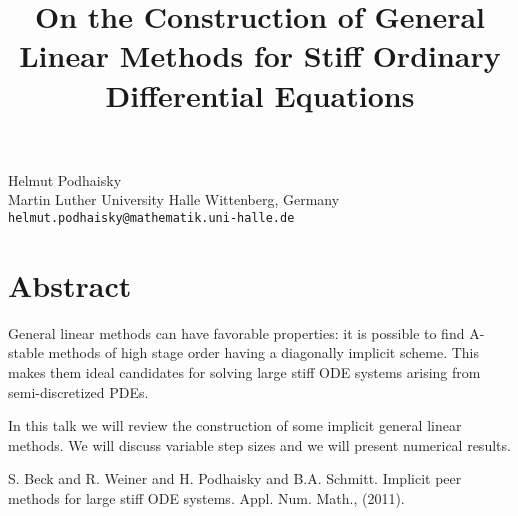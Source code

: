 \title{On the Construction of General Linear Methods for Stiff Ordinary Differential Equations}
 \author{} \institute{}
\maketitle
\begin{center}
{\large Helmut Podhaisky}\\
Martin Luther University Halle Wittenberg, Germany\\
{\tt helmut.podhaisky@mathematik.uni-halle.de}

\end{center}

\section*{Abstract}

General linear methods can have favorable properties: it is possible to find
A-stable methods of high stage order having a diagonally implicit scheme.
This makes them ideal candidates for solving large stiff ODE systems arising
from semi-discretized PDEs.

In this talk we will review the construction of some implicit general linear methods. We will
discuss variable step sizes and we will present numerical results.



\begin{thebibliography}{10}

{\sc S. Beck and R. Weiner and H. Podhaisky and B.A. Schmitt}. {Implicit peer methods for large stiff ODE systems}. Appl. Num. Math., (2011).

\end{thebibliography}
